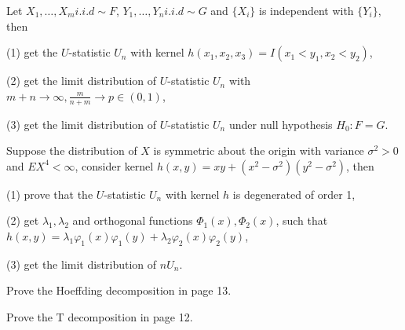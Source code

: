 \begin{problem}
Let $X_1,\ldots,X_m i.i.d\sim F$, $Y_1,\ldots,Y_n i.i.d \sim G$ and $\{X_i\}$ is independent with $\{Y_i\}$, then

(1) get the $U$-statistic $U_n$ with kernel $h(x_1,x_2,x_3)=I(x_1<y_1,x_2<y_2)$,

(2) get the limit distribution of $U$-statistic $U_n$ with $m+n\rightarrow\infty, \frac{m}{n+m}\rightarrow p\in (0,1)$,

(3) get the limit distribution of $U$-statistic $U_n$ under null hypothesis $H_0:F=G$.

\end{problem}


\begin{solution}
    
\end{solution}




\begin{problem}
    Suppose the distribution of $X$ is symmetric about the origin with variance $\sigma^2>0$ and $EX^4 < \infty$, consider kernel $h(x,y)=xy+(x^2-\sigma^2)(y^2-\sigma^2)$, then

(1) prove that the $U$-statistic $U_n$ with kernel $h$ is degenerated of order 1,

(2) get $\lambda_1, \lambda_2$ and orthogonal functions $\Phi_1(x), \Phi_2(x)$, such that $h(x,y)=\lambda_1\varphi_1(x)\varphi_1(y)+\lambda_2\varphi_2(x)\varphi_2(y)$,

(3) get the limit distribution of $n U_n$.
\end{problem}


\begin{solution}
    
\end{solution}




\begin{problem}
    Prove the Hoeffding decomposition in page 13.
\end{problem}


\begin{solution}
    
\end{solution}




\begin{problem}
    Prove the T decomposition in page 12.
\end{problem}


\begin{solution}
    
\end{solution}




